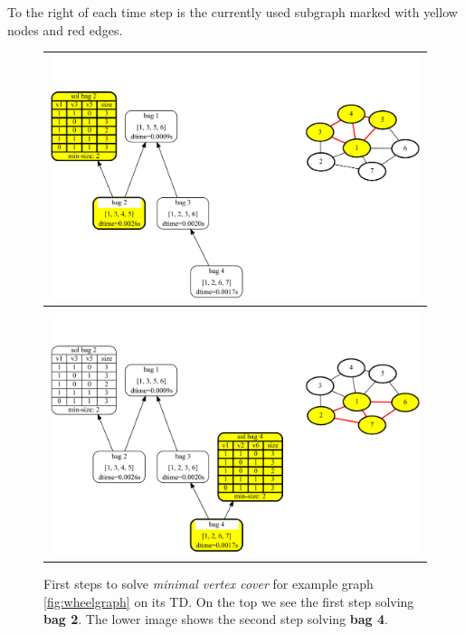 \documentclass[a4paper, 12pt, bibliography=totoc]{scrartcl}
\begin{document}
To the right of each time step is the currently used subgraph marked with yellow nodes and red edges.


\begin{figure}[H]
	\centering
	\begin{tabular}{c}	
	\includegraphics[width=0.99\linewidth]{images/WheelGraph7/combined2.pdf}  \\
	\hline 	\\			
		\includegraphics[width=0.99\linewidth]{images/WheelGraph7/combined3.pdf}
	\end{tabular}
	\caption[First steps to solve \textit{minimal vertex cover} for example graph \ref{fig:wheelgraph}]{First steps to solve \textit{minimal vertex cover} for example graph \ref{fig:wheelgraph} on its TD. On the top we see the first step solving \textbf{bag 2}. The lower image shows the second step solving \textbf{bag 4}.}
	\label{fig:wheelgraphc23}
\end{figure}
\end{document}
